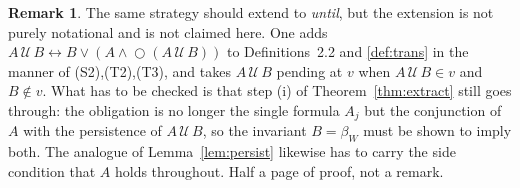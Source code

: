 \documentclass[11pt,a4paper]{article}
\theoremstyle{definition}
\newtheorem{remark}[theorem]{Remark}
\newcommand{\Next}{\mathop{\bigcirc}}
\begin{document}
\begin{remark}
The same strategy should extend to \emph{until}, but the extension is not
purely notational and is not claimed here.  One adds
$A\,\mathcal{U}\,B\leftrightarrow B\vee(A\wedge\Next(A\,\mathcal{U}\,B))$ to
Definitions~2.2 and \ref{def:trans} in the manner of (S2),(T2),(T3), and takes
$A\,\mathcal{U}\,B$ pending at $v$ when $A\,\mathcal{U}\,B\in v$ and $B\notin v$.
What has to be checked is that step (i) of Theorem~\ref{thm:extract} still
goes through: the obligation is no longer the single formula $A_j$ but the
conjunction of $A$ with the persistence of $A\,\mathcal{U}\,B$, so the invariant
$B=\beta_W$ must be shown to imply both.  The analogue of
Lemma~\ref{lem:persist} likewise has to carry the side condition that $A$ holds
throughout.  Half a page of proof, not a remark.
\end{remark}
\end{document}
